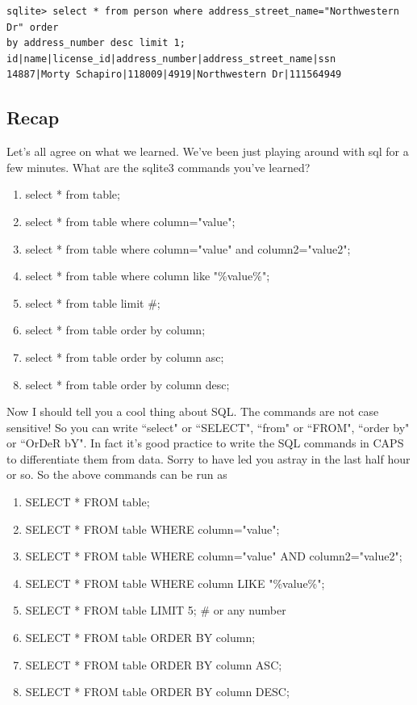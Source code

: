 \documentclass[12pt,a4paper]{article}
\begin{document}
\begin{lstlisting}[style=term]
sqlite> select * from person where address_street_name="Northwestern Dr" order
by address_number desc limit 1;
id|name|license_id|address_number|address_street_name|ssn
14887|Morty Schapiro|118009|4919|Northwestern Dr|111564949
\end{lstlisting}

\subsection{Recap}
Let's all agree on what we learned. We've been just playing around with sql for
a few minutes. What are the sqlite3 commands you've learned?

\begin{enumerate}
\item select * from table;
\item select * from table where column="value";
\item select * from table where column="value" and column2="value2";
\item select * from table where column like "\%value\%";
\item select * from table limit \#;
\item select * from table order by column;
\item select * from table order by column asc;
\item select * from table order by column desc;
\end{enumerate}

Now I should tell you a cool thing about SQL. The commands are not case
sensitive! So you can write ``select" or ``SELECT", ``from" or ``FROM", ``order by" or ``OrDeR
bY". In fact it's good practice to write the SQL commands in CAPS to
differentiate them from data. Sorry to have led you astray in the last half hour
or so. So the above commands can be run as 

\begin{enumerate}
\item SELECT * FROM table;
\item SELECT * FROM table WHERE column="value";
\item SELECT * FROM table WHERE column="value" AND column2="value2";
\item SELECT * FROM table WHERE column LIKE "\%value\%";
\item SELECT * FROM table LIMIT 5; \# or any number
\item SELECT * FROM table ORDER BY column;
\item SELECT * FROM table ORDER BY column ASC;
\item SELECT * FROM table ORDER BY column DESC;
\end{enumerate}
\end{document}
